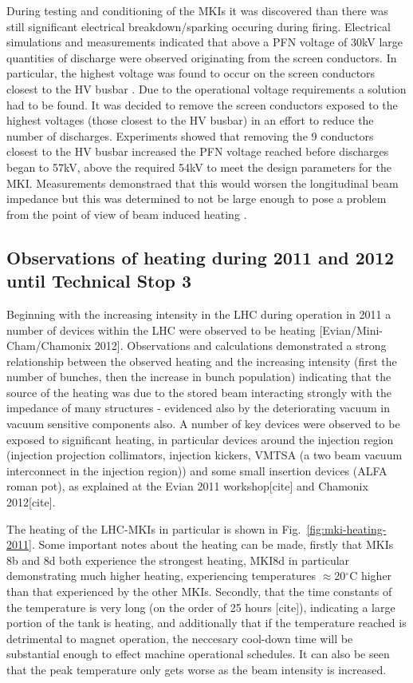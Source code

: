 During testing and conditioning of the MKIs it was discovered than there was still significant electrical breakdown/sparking occuring during firing. Electrical simulations and measurements indicated that above a PFN voltage of 30kV large quantities of discharge were observed originating from the screen conductors. In particular, the highest voltage was found to occur on the screen conductors closest to the HV busbar \cite{Barnes:improvBeamScreen}. Due to the operational voltage requirements a solution had to be found. It was decided to remove the screen conductors exposed to the highest voltages (those closest to the HV busbar) in an effort to reduce the number of discharges. Experiments showed that removing the 9 conductors closest to the HV busbar increased the PFN voltage reached before discharges began to 57kV, above the required 54kV to meet the design parameters for the MKI. Measurements demonstraed that this would worsen the longitudinal beam impedance but this was determined to not be large enough to pose a problem from the point of view of beam induced heating \cite{Barnes:improvBeamScreen}.

\subsection{Observations of heating during 2011 and 2012 until Technical Stop 3}

Beginning with the increasing intensity in the LHC during operation in 2011 a number of devices within the LHC were observed to be heating [Evian/Mini-Cham/Chamonix 2012]. Observations and calculations demonstrated a strong relationship between the observed heating and the increasing intensity (first the number of bunches, then the increase in bunch population) indicating that the source of the heating was due to the stored beam interacting strongly with the impedance of many structures - evidenced also by the deteriorating vacuum in vacuum sensitive components also. A number of key devices were observed to be exposed to significant heating, in particular devices around the injection region (injection projection collimators, injection kickers, VMTSA (a two beam vacuum interconnect in the injection region)) and some small insertion devices (ALFA roman pot), as explained at the Evian 2011 workshop[cite] and Chamonix 2012[cite]. 

The heating of the LHC-MKIs in particular is shown in Fig.~\ref{fig:mki-heating-2011}. Some important notes about the heating can be made, firstly that MKIs 8b and 8d both experience the strongest heating, MKI8d in particular demonstrating much higher heating, experiencing temperatures $\approx$20$^{\circ}$C higher than that experienced by the other MKIs. Secondly, that the time constants of the temperature is very long (on the order of 25 hours [cite]), indicating a large portion of the tank is heating, and additionally that if the temperature reached is detrimental to magnet operation, the neccesary cool-down time will be substantial enough to effect machine operational schedules. It can also be seen that the peak temperature only gets worse as the beam intensity is increased.

